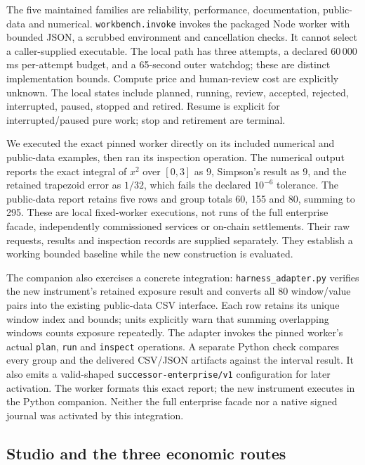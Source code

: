 \documentclass[11pt,letterpaper]{article}
\begin{document}
The five maintained families are reliability, performance, documentation, public-data and numerical. \texttt{workbench.\allowbreak{}invoke} invokes the packaged Node worker with bounded JSON, a scrubbed environment and cancellation checks. It cannot select a caller-supplied executable. The local path has three attempts, a declared 60\,000\,ms per-attempt budget, and a 65-second outer watchdog; these are distinct implementation bounds. Compute price and human-review cost are explicitly unknown. The local states include planned, running, review, accepted, rejected, interrupted, paused, stopped and retired. Resume is explicit for interrupted/paused pure work; stop and retirement are terminal.

We executed the exact pinned worker directly on its included numerical and public-data examples, then ran its inspection operation. The numerical output reports the exact integral of $x^2$ over $[0,3]$ as $9$, Simpson's result as $9$, and the retained trapezoid error as $1/32$, which fails the declared $10^{-6}$ tolerance. The public-data report retains five rows and group totals 60, 155 and 80, summing to 295. These are local fixed-worker executions, not runs of the full enterprise facade, independently commissioned services or on-chain settlements. Their raw requests, results and inspection records are supplied separately. They establish a working bounded baseline while the new construction is evaluated.

The companion also exercises a concrete integration: \texttt{harness\_\allowbreak{}adapter.\allowbreak{}py} verifies the new instrument's retained exposure result and converts all 80 window/value pairs into the existing public-data CSV interface. Each row retains its unique window index and bounds; units explicitly warn that summing overlapping windows counts exposure repeatedly. The adapter invokes the pinned worker's actual \texttt{plan}, \texttt{run} and \texttt{inspect} operations. A separate Python check compares every group and the delivered CSV/JSON artifacts against the interval result. It also emits a valid-shaped \texttt{successor-\allowbreak{}enterprise/\allowbreak{}v1} configuration for later activation. The worker formats this exact report; the new instrument executes in the Python companion. Neither the full enterprise facade nor a native signed journal was activated by this integration.

\subsection{Studio and the three economic routes}
\end{document}

